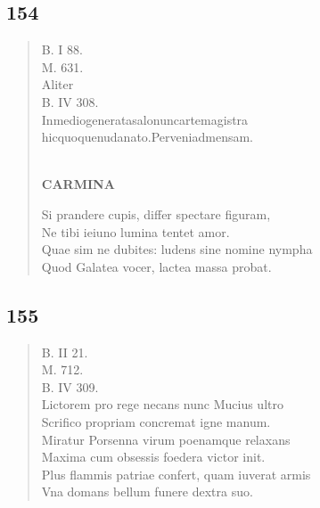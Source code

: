 \documentclass[11pt, a4paper]{report}
\begin{document}
            \subsection*{154}
      \begin{verse}
      B. I 88. \\ M. 631. \\ Aliter \\ B. IV 308. \\ Inmediogeneratasalonuncartemagistra \\ hicquoquenudanato.Perveniadmensam. \\ 
        ﻿\pagebreak 
     \marginpar{[146]} \begin{center} \textbf{CARMINA} \end{center}Si prandere cupis, differ spectare figuram, \\ Ne tibi ieiuno lumina tentet amor. \\ Quae sim ne dubites: ludens sine nomine nympha \\ Quod Galatea vocer, lactea massa probat. \\ 
      \end{verse}
  
            \subsection*{155}
      \begin{verse}
      B. II 21. \\ M. 712. \\ B. IV 309. \\ Lictorem pro rege necans nunc Mucius ultro \\ Scrifico propriam concremat igne manum. \\ Miratur Porsenna virum poenamque relaxans \\ Maxima cum obsessis foedera victor init. \\ Plus flammis patriae confert, quam iuverat armis \\ Vna domans bellum funere dextra suo. \\ 
      \end{verse}
  
\end{document}
